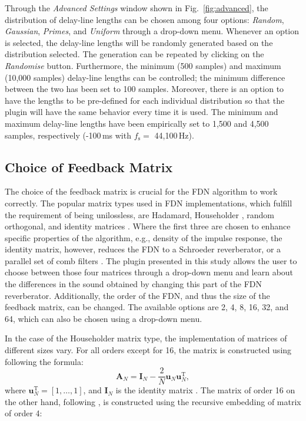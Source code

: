 \documentclass[twoside,a4paper]{article}
\newcommand{\silvin}[1]{\textcolor{ForestGreen}{#1}}
\begin{document}
Through the \textit{Advanced Settings} window shown in Fig.~\ref{fig:advanced}, the distribution of delay-line lengths can be chosen among four options: \textit{Random}, \textit{Gaussian}, \textit{Primes}, and \textit{Uniform} through a drop-down menu. Whenever an option is selected, the delay-line lengths will be randomly generated based on the distribution selected. The generation can be repeated by clicking on the \textit{Randomise} button. Furthermore, the minimum (500 samples) and maximum (10,000 samples) delay-line lengths can be controlled; the minimum difference between the two has been set to 100 samples. 
Moreover, there is an option to have the lengths to be pre-defined for each individual distribution so that the plugin will have the same behavior every time it is used. The minimum and maximum delay-line lengths have been empirically set to 1,500 and 4,500 samples, respectively (-100\,ms with $f_\text{s} =$  44,100\,Hz).


\subsection{Choice of Feedback Matrix}

The choice of the feedback matrix is crucial for the FDN algorithm to work correctly. The popular matrix types used in FDN implementations, which fulfill the requirement of being unilossless, are Hadamard, Householder \cite{Jot:1997:icm}, random orthogonal, and identity matrices \cite{menzer2010unitary}. Where the first three are chosen to enhance specific properties of the algorithm, e.g., density of the impulse response, the identity matrix, however, reduces the FDN to a Schroeder reverberator, or a parallel set of comb filters \cite{Jot:Chaine:1991:aes, menzer2010unitary}. The plugin presented in this study allows the user to choose between those four matrices through a drop-down menu and learn about the differences in the sound obtained by changing this part of the FDN reverberator. 
%
Additionally, the order of the FDN, and thus the size of the feedback matrix, can be changed. The available options are 2, 4, 8, 16, 32, and 64, which can also be chosen using a drop-down menu. %

In the case of the Householder matrix type, the implementation of matrices of different sizes vary. For all orders except for 16, the matrix is constructed using following the formula:
\begin{equation}
\mathbf{A}_N = \mathbf{I}_N - \frac{2}{N} \mathbf{u}_N\mathbf{u}_N^\textrm{T},
\label{eq:house}
\end{equation}
where $\mathbf{u}_N^\textrm{T} = [1,\hdots, 1]$, and $\mathbf{I}_N$ is the identity matrix \cite{Jot:1997:icm}. The matrix of order 16 on the other hand, following \cite{PASPWEB2010}, is constructed using the recursive embedding of matrix of order 4:
\end{document}
